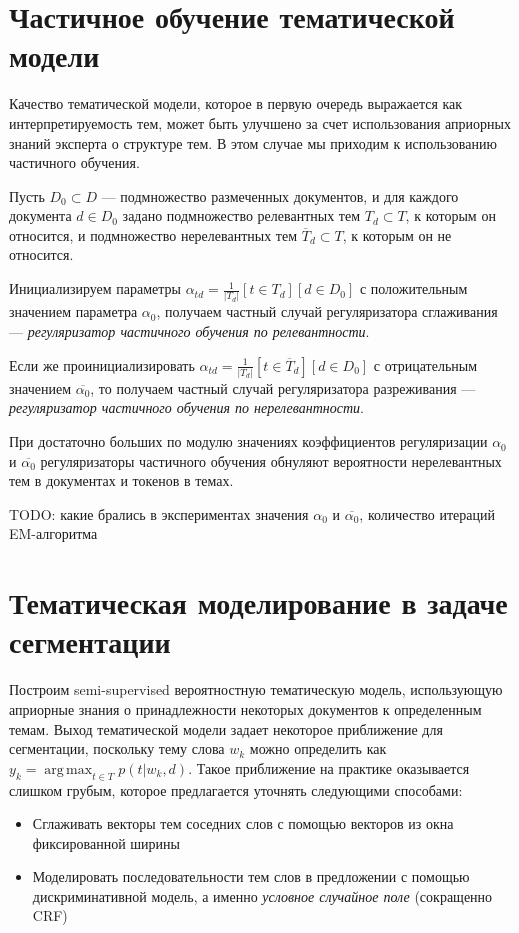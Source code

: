 \documentclass[pdftex,ptm,12pt,a4paper]{report}
\theoremstyle{definition}
\DeclareMathOperator*{\argmax}{arg\,max}
\begin{document}
\section{Частичное обучение тематической модели}
Качество тематической модели, которое в первую очередь выражается как интерпретируемость тем, может быть улучшено за счет использования априорных знаний эксперта о структуре тем. В этом случае мы приходим к использованию частичного обучения. 

Пусть $D_0 \subset D$ --- подмножество размеченных документов, и для каждого документа $d \in D_0$ задано подмножество релевантных тем $T_d \subset T$, к которым он относится,
и подмножество нерелевантных тем $\overline{T}_d \subset T$, к которым он не относится. 

Инициализируем параметры $\alpha_{td} = \frac{1}{|T_d|}[t \in T_d][d \in D_0]$ с положительным значением параметра $\alpha_0$, получаем частный случай регуляризатора сглаживания --- \textit{регуляризатор частичного обучения по релевантности}. 

Если же проинициализировать $\alpha_{td} = \frac{1}{|T_d|}[t \in \overline{T}_d][d \in D_0]$ с отрицательным значением $\overline{\alpha_0}$, то получаем частный случай регуляризатора разреживания --- \textit{регуляризатор частичного обучения по нерелевантности}. 

При достаточно больших по модулю значениях коэффициентов регуляризации $\alpha_0$ и $\overline{\alpha_0}$ регуляризаторы частичного обучения обнуляют вероятности нерелевантных тем в документах и токенов в темах. 

TODO: какие брались в экспериментах значения $\alpha_0$ и $\overline{\alpha_0}$, количество итераций EM-алгоритма

\section{Тематическая моделирование в задаче сегментации}

 Построим semi-supervised вероятностную тематическую модель, использующую априорные знания о принадлежности некоторых документов к определенным темам. Выход тематической модели задает некоторое приближение для сегментации, поскольку тему слова $w_k$ можно определить как $y_k = \argmax_{t\in T}p(t|w_k,d)$. Такое приближение на практике оказывается слишком грубым, которое предлагается уточнять следующими способами:
\begin{itemize}
	\item Сглаживать векторы тем соседних слов с помощью векторов из окна фиксированной ширины
	
	\item Моделировать последовательности тем слов в предложении с помощью
	дискриминативной модель, а именно \textit{условное случайное поле} (сокращенно CRF)
	
\end{itemize} 
\end{document}
